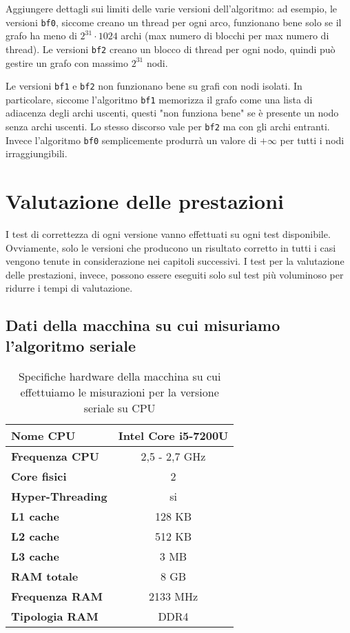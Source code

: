 \documentclass[a4paper]{article}
\begin{document}
	Aggiungere dettagli sui limiti delle varie versioni dell'algoritmo: ad esempio, le versioni \texttt{bf0}, siccome creano un thread per ogni arco, funzionano bene solo se il grafo ha meno di $2^{31}\cdot 1024$ archi (max numero di blocchi per max numero di thread). Le versioni \texttt{bf2} creano un blocco di thread per ogni nodo, quindi può gestire un grafo con massimo $2^{31}$ nodi.
	
	Le versioni \texttt{bf1} e \texttt{bf2} non funzionano bene su grafi con nodi isolati. In particolare, siccome l'algoritmo \texttt{bf1} memorizza il grafo come una lista di adiacenza degli archi uscenti, questi "non funziona bene" se è presente un nodo senza archi uscenti. Lo stesso discorso vale per \texttt{bf2} ma con gli archi entranti. Invece l'algoritmo \texttt{bf0} semplicemente produrrà un valore di $+\infty$ per tutti i nodi irraggiungibili.
	
	\section{Valutazione delle prestazioni}
	\label{section:perf}
	I test di correttezza di ogni versione vanno effettuati su ogni test disponibile. Ovviamente, solo le versioni che producono un risultato corretto in tutti i casi vengono tenute in considerazione nei capitoli successivi. I test per la valutazione delle prestazioni, invece, possono essere eseguiti solo sul test più voluminoso per ridurre i tempi di valutazione.
	
	\subsection{Dati della macchina su cui misuriamo l'algoritmo seriale}
	\begin{table}[!ht]
		\centering
		\begin{tabular}{|l|c|}
			\hline
			\textbf{Nome CPU} & Intel Core i5-7200U \\ \hline
			\textbf{Frequenza CPU} & 2,5 - 2,7 GHz \\ \hline
			\textbf{Core fisici} & 2 \\ \hline
			\textbf{Hyper-Threading} & si \\ \hline
			\textbf{L1 cache} & 128 KB \\ \hline
			\textbf{L2 cache} & 512 KB \\ \hline
			\textbf{L3 cache} & 3 MB \\ \hline
			\textbf{RAM totale} & 8 GB \\ \hline
			\textbf{Frequenza RAM} & 2133 MHz \\ \hline
			\textbf{Tipologia RAM} & DDR4 \\ \hline
		\end{tabular}
		\label{tab:specs_serial_cpu}
		\caption{Specifiche hardware della macchina su cui effettuiamo le misurazioni per la versione seriale su CPU}
	\end{table}
\end{document}
